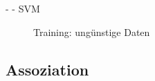 \documentclass[fleqn,11pt,aspectratio=43]{beamer}
\begin{document}
\begin{frame}{\insertsectionhead - \insertsubsectionhead - SVM}
\begin{figure}
\scalebox{1.0}{}
\caption{Training: ungünstige Daten}
\end{figure}
\end{frame}

%
%

%
%

\subsection{Assoziation~}

\end{document}
